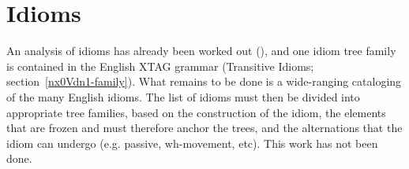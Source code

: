 \section{Idioms}

An analysis of idioms has already been worked out (\cite{AS89}), and one idiom
tree family is contained in the English XTAG grammar (Transitive Idioms;
section~\ref{nx0Vdn1-family}).  What remains to be done is a wide-ranging
cataloging of the many English idioms.  The list of idioms must then be divided
into appropriate tree families, based on the construction of the idiom, the
elements that are frozen and must therefore anchor the trees, and the
alternations that the idiom can undergo (e.g. passive, wh-movement, etc).  This
work has not been done.





















